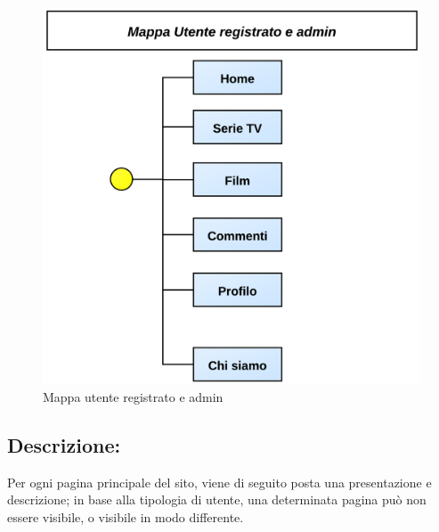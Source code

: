 \begin{itemize}
\begin{center}
\begin{figure}[H]
\centering
\includegraphics[scale=0.60]{images/mapRegistrato.png}
\caption{Mappa utente registrato e admin}
\end{figure}
\end{center}


\end{itemize}


\subsection{Descrizione:}
Per ogni pagina principale del sito, viene di seguito posta una presentazione e descrizione; in base alla tipologia di utente, una determinata pagina può non essere visibile, o visibile in modo differente.

